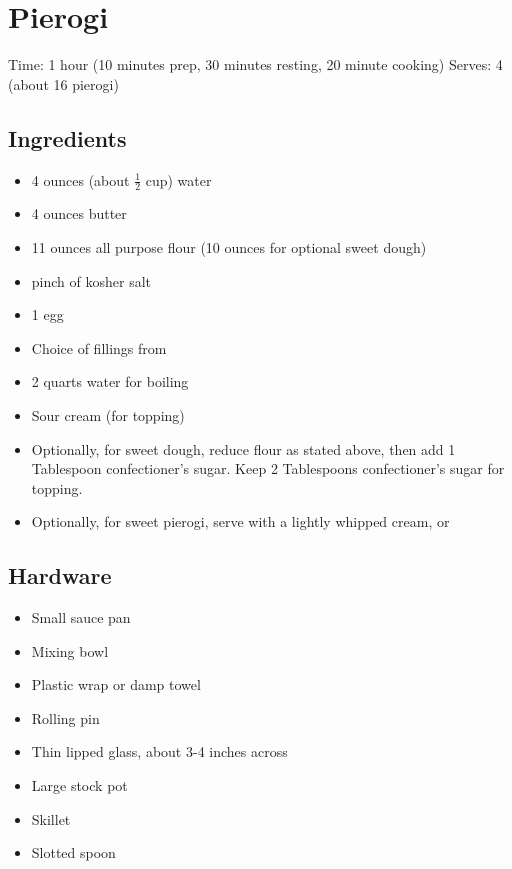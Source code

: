 \section{Pierogi}
\label{pierogi}
\setcounter{secnumdepth}{0}
Time: 1 hour (10 minutes prep, 30 minutes resting, 20 minute cooking)
Serves: 4 (about 16 pierogi)

\begin{multicols}{2}
\subsection*{Ingredients}
\begin{itemize}
    \item 4 ounces (about \( \frac{1}{2} \) cup) water
    \item 4 ounces butter
    \item 11 ounces all purpose flour (10 ounces for optional sweet dough)
    \item pinch of kosher salt
    \item 1 egg
    \item Choice of fillings from 
    \item 2 quarts water for boiling
    \item Sour cream (for topping)
    \item Optionally, for sweet dough, reduce flour as stated above, then add 1 Tablespoon confectioner's sugar. Keep 2 Tablespoons confectioner's sugar for topping.
    \item Optionally, for sweet pierogi, serve with a lightly whipped cream, or 
\end{itemize}

\subsection*{Hardware}
\begin{itemize}
    \item Small sauce pan
    \item Mixing bowl
    \item Plastic wrap or damp towel
    \item Rolling pin
    \item Thin lipped glass, about 3-4 inches across
    \item Large stock pot
    \item Skillet
    \item Slotted spoon
\end{itemize}
\clearpage


\end{multicols}
